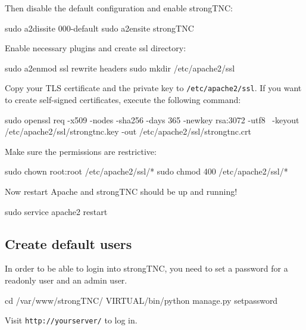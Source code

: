 Then disable the default configuration and enable strongTNC:

\begin{bashcode}
sudo a2dissite 000-default
sudo a2ensite strongTNC
\end{bashcode}

Enable necessary plugins and create ssl directory:

\begin{bashcode}
sudo a2enmod ssl rewrite headers
sudo mkdir /etc/apache2/ssl
\end{bashcode}

Copy your TLS certificate and the private key to \texttt{/etc/apache2/ssl}. If
you want to create self-signed certificates, execute the following command:

\begin{bashcode}
sudo openssl req -x509 -nodes -sha256 -days 365 -newkey rsa:3072 -utf8 \
    -keyout /etc/apache2/ssl/strongtnc.key -out /etc/apache2/ssl/strongtnc.crt
\end{bashcode}

Make sure the permissions are restrictive:

\begin{bashcode}
sudo chown root:root /etc/apache2/ssl/*
sudo chmod 400 /etc/apache2/ssl/*
\end{bashcode}

Now restart Apache and strongTNC should be up and running!

\begin{bashcode}
sudo service apache2 restart
\end{bashcode}

\subsection*{Create default users}

In order to be able to login into strongTNC, you need to set a password for a
readonly user and an admin user.

\begin{bashcode}
cd /var/www/strongTNC/
VIRTUAL/bin/python manage.py setpassword
\end{bashcode}

Visit \texttt{http://yourserver/} to log in.

